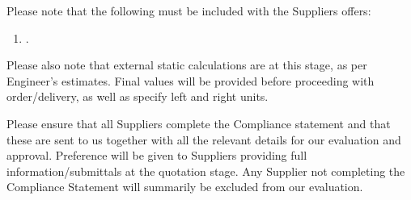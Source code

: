 \documentclass[a4paper,11pt,oneside]{article}
\def\signature{%
 \YL\encl}
\begin{document}
Please note that the following must be included with the Suppliers offers:

\begin{enumerate}
\item .

\end{enumerate}

Please also note that external static calculations are at this stage, as per Engineer's estimates. Final values will be provided before proceeding with order/delivery, as well as specify left and right units.


Please ensure that all Suppliers complete the Compliance statement and that these are sent to us together with all the relevant details for our evaluation and approval. Preference will be given to Suppliers providing full information/submittals at the quotation stage. Any Supplier not completing the Compliance Statement will summarily be excluded from our evaluation.



\signature
\end{document}

